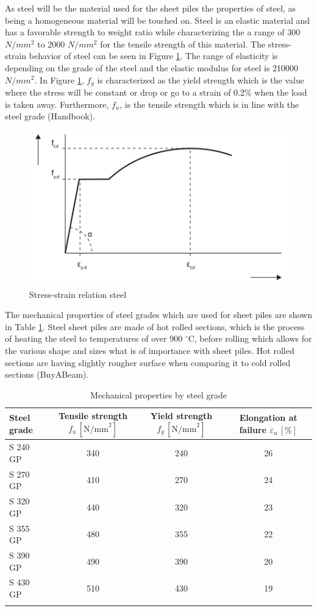 As steel will be the material used for the sheet piles the properties of steel, as being a homogeneous material will be touched on. Steel is an elastic material and has a favorable strength to weight ratio while characterizing the a range of 300 $N/mm^{2}$ to 2000 $N/mm^{2}$ for the tensile strength of this material. The stress-strain behavior of steel can be seen in Figure \ref{fig:stress_strain_steel}. The range of elasticity is depending on the grade of the steel and the elastic modulus for steel is 210000 $N/mm^{2}$. In Figure \ref{fig:stress_strain_steel}, $f_{y}$ is characterized as the yield strength which is the value where the stress will be constant or drop or go to a strain of 0.2\% when the load is taken away. Furthermore, $f_{u}$, is the tensile strength which is in line with the steel grade (Handbook).

\begin{figure}[H]
    \centering
    \includegraphics[width=0.50\linewidth]{figures/ch8/stress_strain_steel.png}
    \caption{Stress-strain relation steel}
    \label{fig:stress_strain_steel}
\end{figure}

The mechanical properties of steel grades which are used for sheet piles are shown in Table \ref{tab:steel_materialproperties}. Steel sheet piles are made of hot rolled sections, which is the process of heating the steel to temperatures of over 900 $^{\circ}$C, before rolling which allows for the various shape and sizes what is of importance with sheet piles. Hot rolled sections are having slightly rougher surface when comparing it to cold rolled sections (BuyABeam). 

\begin{table}[ht]
  \centering
  \caption{Mechanical properties by steel grade}
  \label{tab:steel-grades}
  \setlength{\tabcolsep}{10pt}
  \renewcommand{\arraystretch}{1.25}
  \begin{tabular}{lccc}
    \toprule
    \textbf{Steel grade}
    & \textbf{Tensile strength} $f_{u}\,[\mathrm{N/mm}^{2}]$
    & \textbf{Yield strength} $f_{y}\,[\mathrm{N/mm}^{2}]$
    & \textbf{Elongation at failure} $\varepsilon_{u}\,[\%]$ \\
    \midrule
    S 240 GP & 340 & 240 & 26 \\
    S 270 GP & 410 & 270 & 24 \\
    S 320 GP & 440 & 320 & 23 \\
    S 355 GP & 480 & 355 & 22 \\
    S 390 GP & 490 & 390 & 20 \\
    S 430 GP & 510 & 430 & 19 \\
    \bottomrule
    \label{tab:steel_materialproperties}
  \end{tabular}
\end{table}

